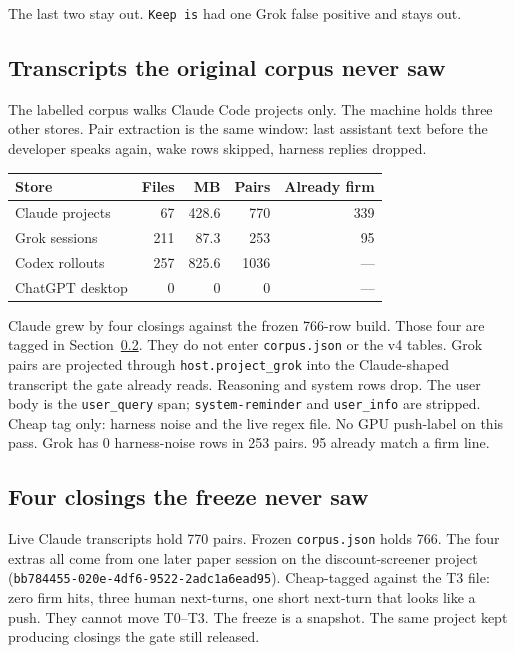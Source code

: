 The last two stay out. \texttt{Keep is} had one Grok false
positive and stays out.

\subsection{Transcripts the original corpus never saw}
\label{sec:expand}

The labelled corpus walks Claude Code projects only. The machine
holds three other stores. Pair extraction is the same window: last
assistant text before the developer speaks again, wake rows skipped,
harness replies dropped.

\begin{center}
{\small\begin{tabular}{lrrrr}
\toprule
Store & Files & MB & Pairs & Already firm \\
\midrule
Claude projects & 67 & 428.6 & 770 & 339 \\
Grok sessions & 211 & 87.3 & 253 & 95 \\
Codex rollouts & 257 & 825.6 & 1036 & --- \\
ChatGPT desktop & 0 & 0 & 0 & --- \\
\bottomrule
\end{tabular}}
\end{center}

Claude grew by four closings against the frozen 766-row build. Those
four are tagged in Section~\ref{sec:extra4}. They do not enter
\texttt{corpus.json} or the v4 tables. Grok
pairs are projected through \texttt{host.project\_grok} into the
Claude-shaped transcript the gate already reads. Reasoning and
system rows drop. The user body is the \texttt{user\_query} span;
\texttt{system-reminder} and \texttt{user\_info} are stripped. Cheap
tag only: harness noise and the live regex file. No GPU push-label
on this pass. Grok has 0 harness-noise rows in 253 pairs. 95 already
match a firm line.


\subsection{Four closings the freeze never saw}
\label{sec:extra4}

Live Claude transcripts hold 770 pairs. Frozen \texttt{corpus.json}
holds 766. The four extras all come from one later paper session on
the discount-screener project
(\texttt{bb784455-020e-4df6-9522-2adc1a6ead95}). Cheap-tagged
against the T3 file: zero firm hits, three human next-turns, one
short next-turn that looks like a push. They cannot move T0--T3.
The freeze is a snapshot. The same project kept producing closings
the gate still released.

